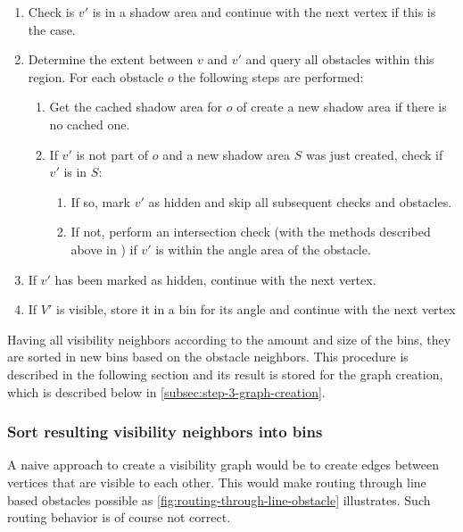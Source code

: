 				\begin{enumerate}
					\item Check is $v'$ is in a shadow area and continue with the next vertex if this is the case.
					\item Determine the extent between $v$ and $v'$ and query all obstacles within this region. For each obstacle $o$ the following steps are performed:
					\begin{enumerate}
						\item Get the cached shadow area for $o$ of create a new shadow area if there is no cached one.
						\item If $v'$ is not part of $o$ and a new shadow area $S$ was just created, check if $v'$ is in $S$:
						\begin{enumerate}
							\item If so, mark $v'$ as hidden and skip all subsequent checks and obstacles.
							\item If not, perform an intersection check (with the methods described above in \emph{}) if $v'$ is within the angle area of the obstacle.
						\end{enumerate}
					\end{enumerate}
					\item If $v'$ has been marked as hidden, continue with the next vertex.
					\item If $V'$ is visible, store it in a bin for its angle and continue with the next vertex
				\end{enumerate}
			
				Having all visibility neighbors according to the amount and size of the bins, they are sorted in new bins based on the obstacle neighbors.
				This procedure is described in the following section and its result is stored for the graph creation, which is described below in \cref{subsec:step-3-graph-creation}.
			
			\subsubsection{Sort resulting visibility neighbors into bins}
			
				A naive approach to create a visibility graph would be to create edges between vertices that are visible to each other.
				This would make routing through line based obstacles possible as \cref{fig:routing-through-line-obstacle} illustrates.
				Such routing behavior is of course not correct.
				
